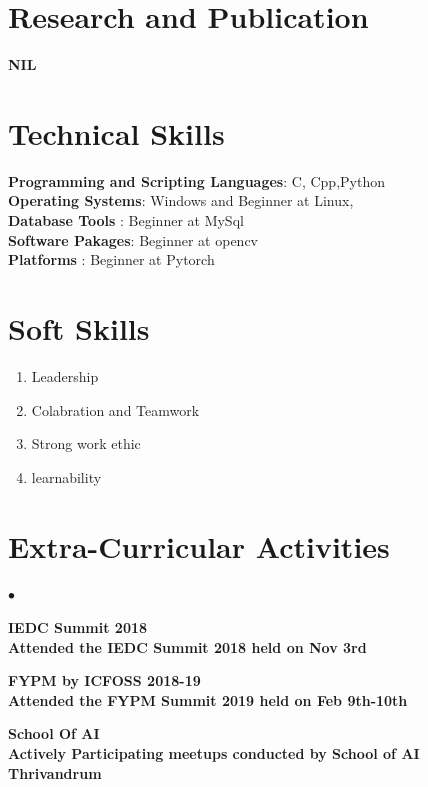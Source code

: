 \documentclass[margin,line]{res}
\newenvironment{list2}{
	\begin{list}{$\bullet$}{%
			\setlength{\itemsep}{0in}
			\setlength{\parsep}{0in} \setlength{\parskip}{0in}
			\setlength{\topsep}{0in} \setlength{\partopsep}{0in}
			\setlength{\leftmargin}{0.2in}}}{\end{list}}
\begin{document}
\begin{resume}
\section{\sc Research and Publication}

\bf NIL
\vspace{.1in}
\section{\sc Technical Skills}
{\bf Programming and Scripting Languages}:  C, Cpp,Python \\
{\bf Operating Systems}: Windows and Beginner at Linux,\\
{\bf Database Tools}  :  Beginner at MySql\\
{\bf Software Pakages}:  Beginner at opencv\\
{\bf Platforms}       : Beginner at Pytorch
\section{\sc Soft Skills}
\begin{enumerate} %
	\item Leadership 
	\item Colabration and Teamwork
	\item Strong work ethic 
	\item learnability 
\end{enumerate}

\section{\sc Extra-Curricular Activities}
\begin{list2} %
	\item \bf IEDC Summit 2018 \\
	Attended  the IEDC Summit 2018 held on Nov 3rd \\
	\item \bf FYPM by ICFOSS 2018-19\\
	Attended the FYPM Summit 2019 held on Feb 9th-10th 
	\item \bf School Of AI  \\
	Actively Participating meetups conducted by School of AI Thrivandrum
	
\end{list2}
\end{resume}
\end{document}
